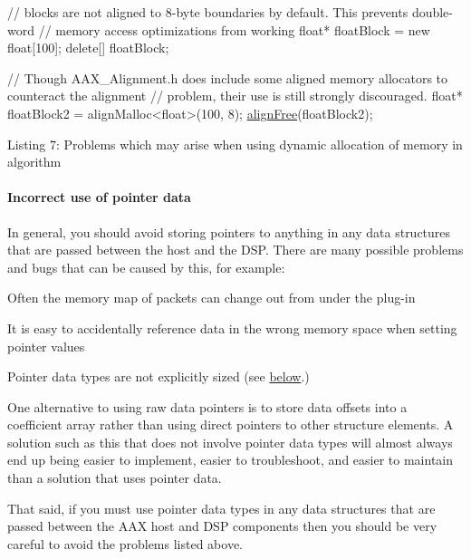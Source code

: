 \begin{DoxyCode}
\textcolor{comment}{// blocks are not aligned to 8-byte boundaries by default. This prevents double-word}
\textcolor{comment}{// memory access optimizations from working}
\textcolor{keywordtype}{float}* floatBlock = \textcolor{keyword}{new} \textcolor{keywordtype}{float}[100];
\textcolor{keyword}{delete}[] floatBlock;

\textcolor{comment}{// Though AAX\_Alignment.h does include some aligned memory allocators to counteract the alignment}
\textcolor{comment}{// problem, their use is still strongly discouraged.}
\textcolor{keywordtype}{float}* floatBlock2 = alignMalloc<float>(100, 8);
\hyperlink{a00288_aa7d7e69902012a6272de3ea9aa0264a9}{alignFree}(floatBlock2);
\end{DoxyCode}
  Listing 7\+: Problems which may arise when using dynamic allocation of memory in algorithm

\hypertarget{a00362_subsubsection__incorrect_use_of_pointer_data}{}\paragraph{Incorrect use of pointer data}\label{a00362_subsubsection__incorrect_use_of_pointer_data}
In general, you should avoid storing pointers to anything in any data structures that are passed between the host and the D\+S\+P. There are many possible problems and bugs that can be caused by this, for example\+:


\begin{DoxyItemize}
\item Often the memory map of packets can change out from under the plug-\/in  
\item It is easy to accidentally reference data in the wrong memory space when setting pointer values  
\item Pointer data types are not explicitly sized (see \hyperlink{a00362_subsubsection__pointer_data_size_incompatibility}{below}.)  
\end{DoxyItemize}

One alternative to using raw data pointers is to store data offsets into a coefficient array rather than using direct pointers to other structure elements. A solution such as this that does not involve pointer data types will almost always end up being easier to implement, easier to troubleshoot, and easier to maintain than a solution that uses pointer data.

That said, if you must use pointer data types in any data structures that are passed between the A\+A\+X host and D\+S\+P components then you should be very careful to avoid the problems listed above.

